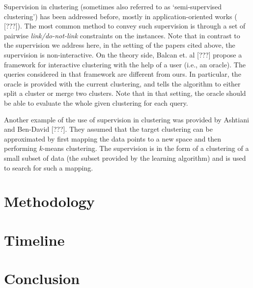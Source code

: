 \documentclass[11pt]{article}
\begin{document}
Supervision in clustering (sometimes also referred to as `semi-supervised clustering') has been addressed before, mostly in application-oriented works ({\color{red} [???]\cite{basu2002semi,basu2004probabilistic, kulis2009semi}}). The most common method to convey such supervision is through a set of pairwise \emph{link/do-not-link} constraints on the instances. Note that in contrast to the supervision we address here, in the setting of the papers cited above, the supervision is non-interactive. On the theory side, Balcan et. al {\color{red} [???]\cite{balcan2008clustering}} propose a framework for interactive clustering with the help of a user (i.e., an oracle). The queries considered in that framework are different from ours. In particular, the oracle is provided with the current clustering, and tells the algorithm to either split a cluster or merge two clusters. Note that in that setting, the oracle should be able to evaluate the whole given clustering for each query.

Another example of the use of supervision in clustering was provided by Ashtiani and Ben-David {\color{red} [???]\cite{ashtiani2015representation}}. They assumed that the target clustering can be approximated by first mapping the data points to a new space and then performing $k$-means clustering. The supervision is in the form of a clustering of a small subset of data (the subset provided by the learning algorithm) and is used to search for such a mapping.


\section{Methodology}
\label{section:methodology}

\section{Timeline}
\label{section:timeline}

\section{Conclusion}
\end{document}
